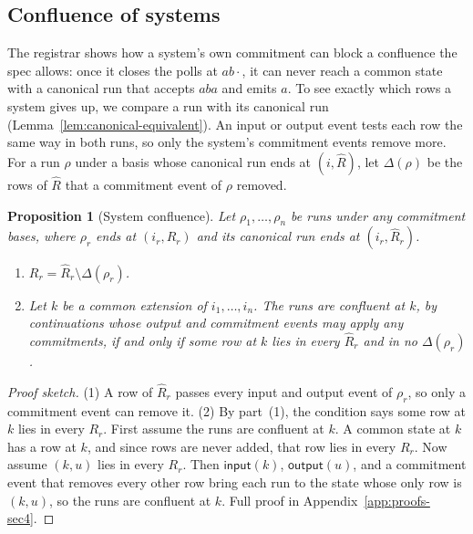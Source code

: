 \documentclass[sigconf]{cidr-2027}
\newtheorem{proposition}{Proposition}
\theoremstyle{remark}
\newcommand{\commitment}{commitment\xspace}
\newcommand{\commitments}{commitments\xspace}
\begin{document}
\subsection{Confluence of systems}
\label{sec:commitment-conflict}

The registrar shows how a system's own \commitment can block a confluence the
spec allows: once it closes the polls at $ab\cdot$, it can never reach a common
state with a canonical run that accepts $aba$ and emits $a$. To see exactly
which rows a system gives up, we compare a run with its canonical run
(Lemma~\ref{lem:canonical-equivalent}). An input or output event tests each
row the same way in both runs, so only the system's \commitment events remove
more. For a run $\rho$ under a basis whose canonical run ends at
$(i,\widehat R)$, let $\Delta(\rho)$ be the rows of $\widehat R$ that a
\commitment event of $\rho$ removed.

\begin{proposition}[System confluence]
\label{prop:system-confluence}
Let $\rho_1,\ldots,\rho_n$ be runs under any \commitment bases, where $\rho_r$
ends at $(i_r,R_r)$ and its canonical run ends at $(i_r,\widehat R_r)$.
\begin{enumerate}
\item
$R_r=\widehat R_r\setminus\Delta(\rho_r)$.
\item
Let $k$ be a common extension of $i_1,\ldots,i_n$. The runs are
        confluent at $k$, by continuations whose output and \commitment events
        may apply any \commitments, if and only if some row at $k$ lies in
        every $\widehat R_r$ and in no $\Delta(\rho_r)$.
\end{enumerate}
\end{proposition}

\begin{proof}[Proof sketch]
(1) A row of $\widehat R_r$ passes every input and output event of $\rho_r$,
so only a \commitment event can remove it. (2) By part~(1), the condition says
some row at $k$ lies in every $R_r$. \textcolor{reviewed}{First assume the runs are confluent at
$k$.} A common state at $k$ has a row at $k$, and since rows are never added,
that row lies in every $R_r$. \textcolor{reviewed}{Now assume $(k,u)$ lies in every $R_r$.} Then
$\mathsf{input}(k)$, $\mathsf{output}(u)$, and a \commitment event that removes
every other row bring each run to the state whose only row is $(k,u)$, so the
runs are confluent at $k$. Full proof in Appendix~\ref{app:proofs-sec4}.
\end{proof}
\end{document}
